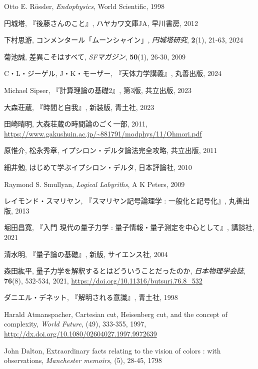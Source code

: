 \documentclass[10pt, a5paper, twoside]{jsarticle}
\theoremstyle{definition}
\begin{document}
\begin{thebibliography}{99}
         Otto E. Rössler, \textit{Endophysics}, World Scientific, 1998

         円城塔, 『後藤さんのこと』, ハヤカワ文庫JA, 早川書房, 2012

         下村思游, コンメンタール「ムーンシャイン」, \textit{円城塔研究}, \textbf{2}(1), 21-63, 2024

         菊池誠, 差異こそはすべて, \textit{SFマガジン}, \textbf{50}(1), 26-30, 2009

         C・L・ジーゲル, J・K・モーザー, 『天体力学講義』, 丸善出版, 2024

         Michael Sipser, 『計算理論の基礎2』, 第3版, 共立出版, 2023

         大森荘蔵, 『時間と自我』, 新装版, 青土社, 2023

         田崎晴明, 大森荘蔵の時間論のごく一部, 2011, \url{https://www.gakushuin.ac.jp/~881791/modphys/11/Ohmori.pdf}

         原惟介, 松永秀章, イプシロン・デルタ論法完全攻略, 共立出版, 2011

         細井勉, はじめて学ぶイプシロン・デルタ, 日本評論社, 2010

         Raymond S. Smullyan, \textit{Logical Labyriths}, A K Peters, 2009

         レイモンド・スマリヤン, 『スマリヤン記号論理学 : 一般化と記号化』, 丸善出版, 2013

         堀田昌寛, 『入門 現代の量子力学 : 量子情報・量子測定を中心として』, 講談社, 2021

         清水明, 『量子論の基礎』, 新版, サイエンス社, 2004

         森田紘平, 量子力学を解釈するとはどういうことだったのか, \textit{日本物理学会誌}, \textbf{76}(8), 532-534, 2021, \url{https://doi.org/10.11316/butsuri.76.8_532}

         ダニエル・デネット, 『解明される意識』, 青土社, 1998

         Harald Atmanspacher, Cartesian cut, Heisenberg cut, and the concept of complexity, \textit{World Future}, (49), 333-355, 1997, \url{http://dx.doi.org/10.1080/02604027.1997.9972639}


         John Dalton, Extraordinary facts relating to the vision of colors : with observations, \textit{Manchester memoirs}, (5), 28-45, 1798


\end{thebibliography}
\end{document}

